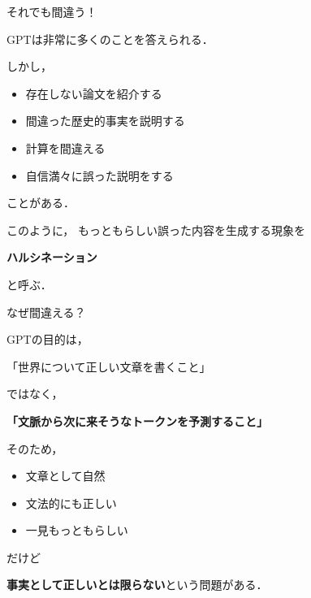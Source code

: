 \documentclass[aspectratio=169,professionalfonts]{beamer}
\begin{document}
\begin{frame}{それでも間違う！}

  GPTは非常に多くのことを答えられる．

  \vspace{1em}

  しかし，

  \begin{itemize}
    \item 存在しない論文を紹介する
    \item 間違った歴史的事実を説明する
    \item 計算を間違える
    \item 自信満々に誤った説明をする
  \end{itemize}

  ことがある．

  \vspace{1em}

  このように，
  もっともらしい誤った内容を生成する現象を

  \begin{center}
    \textbf{ハルシネーション}
  \end{center}

  と呼ぶ．


\end{frame}


\begin{frame}{なぜ間違える？}

  GPTの目的は，

  \begin{center}
    「世界について正しい文章を書くこと」
  \end{center}

  ではなく，

  \begin{center}
    \textbf{「文脈から次に来そうなトークンを予測すること」}
  \end{center}

  \vspace{1em}

  そのため，

  \begin{itemize}
    \item 文章として自然
    \item 文法的にも正しい
    \item 一見もっともらしい
  \end{itemize}

  だけど

  \begin{center}
    \textbf{事実として正しいとは限らない}という問題がある．
  \end{center}


\end{frame}
\end{document}
